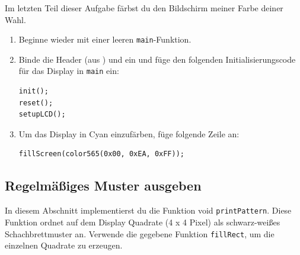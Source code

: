 Im letzten Teil dieser Aufgabe färbst du den Bildschirm meiner Farbe deiner Wahl.
\begin{enumerate}
\item 
Beginne wieder mit einer leeren \lstinline|main|-Funktion.
\item 
Binde die Header  (aus ) und  ein und füge den folgenden Initialisierungscode für das Display in \lstinline|main| ein:
\begin{lstlisting}
init();
reset();
setupLCD();
\end{lstlisting}
\item 
Um das Display in Cyan einzufärben, füge folgende Zeile an:
\begin{lstlisting}
fillScreen(color565(0x00, 0xEA, 0xFF));
\end{lstlisting}
\end{enumerate}



\subsection{Regelmäßiges Muster ausgeben}
In diesem Abschnitt implementierst du die Funktion void \lstinline|printPattern|.
Diese Funktion ordnet auf dem Display Quadrate (4 x 4 Pixel) als schwarz-weißes Schachbrettmuster an.
Verwende die gegebene Funktion \lstinline|fillRect|, um die einzelnen Quadrate zu erzeugen.



